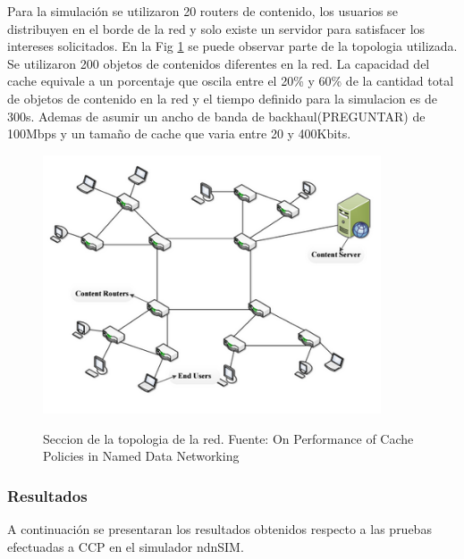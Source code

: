 \documentclass[12pt]{ociamthesis}  %
\begin{document}
Para la simulación se utilizaron 20 routers de contenido, los usuarios se distribuyen en el borde de la red y solo existe un servidor para satisfacer los intereses solicitados. En la Fig \ref{topologia_de_red} se puede observar parte de la topologia utilizada. Se utilizaron 200 objetos de contenidos diferentes en la red. La capacidad del cache equivale a un porcentaje que oscila entre el 20\% y 60\% de la cantidad total de objetos de contenido en la red y el tiempo definido para la simulacion es de 300s. Ademas de asumir un ancho de banda de backhaul(PREGUNTAR) de 100Mbps y un tamaño de cache que varia entre 20 y 400Kbits.\\

\begin{figure}[h]
	\centering
	\includegraphics[width=10cm]{Imagenes/Paper1.1/Topologia_de_red}\\
	\caption{Seccion de la topologia de la red. Fuente: On Performance of Cache Policies in Named Data Networking \cite{ran2013performance}}
	\label{topologia_de_red}
\end{figure}


\subsubsection{Resultados}
A continuación se presentaran los resultados obtenidos respecto a las pruebas efectuadas a CCP en el simulador ndnSIM.
\end{document}
